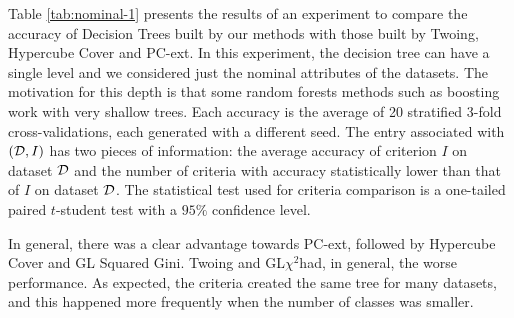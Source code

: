Table \ref{tab:nominal-1} presents  the results of an experiment to
compare the accuracy of  Decision Trees built by  our methods with those built by Twoing, Hypercube Cover and PC-ext.
In this experiment, the decision tree can have a single level and we considered just the nominal attributes of the datasets. 
The motivation for this depth is that some random
forests methods such as boosting work with very shallow trees.
Each accuracy is the average of 20 stratified 3-fold cross-validations,
each generated with a different seed.
The entry  associated with  $({\cal D},I)$ has two pieces of information: the average accuracy
of criterion $I$ on dataset ${\cal D}$ and the number of criteria
with accuracy   statistically lower than that of $I$ on dataset ${\cal D}$. 
The statistical test used for criteria comparison is a  one-tailed paired $t$-student test with a $95\% $ confidence level. 

In general, there was a clear advantage towards PC-ext, followed by Hypercube Cover and GL Squared Gini. Twoing and GL$\chi^2$had, in general, the worse performance. As expected, the criteria created the same tree for many datasets, and this happened more frequently when the number of classes was smaller.


